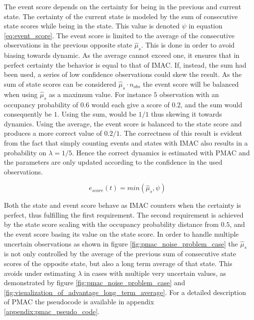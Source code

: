 The event score depends on the certainty for being in the previous and current state. 
The certainty of the current state is modeled by the sum of consecutive state scores while being in the state. This value is denoted $\psi$ in equation \ref{eq:event_score}.
The event score is limited to the average of the consecutive observations in the previous opposite state $\hat{\mu}_{s}$. 
This is done in order to avoid biasing towards dynamic.
As the average cannot exceed one, it ensures that in perfect certainty the behavior is equal to that of IMAC. 
If, instead, the sum had been used, a series of low confidence observations could skew the result. 
As the sum of state scores can be considered $\hat{\mu}_s \cdot n_{obs}$ the event score will be balanced when using $\hat{\mu}_s$ as a maximum value. 
For instance $5$ observation with an occupancy probability of $0.6$ would each give a score of $0.2$, and the sum would consequently be $1$. 
Using the sum,  would be $1/1$  thus skewing it towards dynamics. Using the average, the event score is balanced to the state score and produces a more correct value of $0.2/1$. 
The correctness of this result is evident from the fact that simply counting events and states with IMAC also results in a probability on $\lambda = 1/5$. 
Hence the correct dynamics is estimated with PMAC and the parameters are only updated according to the confidence in the used observations.

\begin{equation}
e_{score}(t)=min(\hat{\mu}_{s},\psi)
\label{eq:event_score}
\end{equation}

Both the state and event score behave as IMAC counters when the certainty is perfect, thus fulfilling the first requirement. The second requirement is achieved by the state score scaling with the occupancy probability distance from $0.5$, and the event score basing its value on the state score.
In order to handle multiple uncertain observations as shown in figure \ref{fig:pmac_noise_problem_case} the $\hat{\mu}_s$ is not only controlled by the average of the previous sum of consecutive state scores of the opposite state, but also a long term average of that state.
This avoids under estimating $\lambda$ in cases with multiple very uncertain values, as demonstrated by figure \ref{fig:pmac_noise_problem_case} and \ref{fig:visualization_of_advantage_long_term_average}.
For a detailed description of PMAC the pseudocode is available in appendix \ref{appendix:pmac_pseudo_code}.

